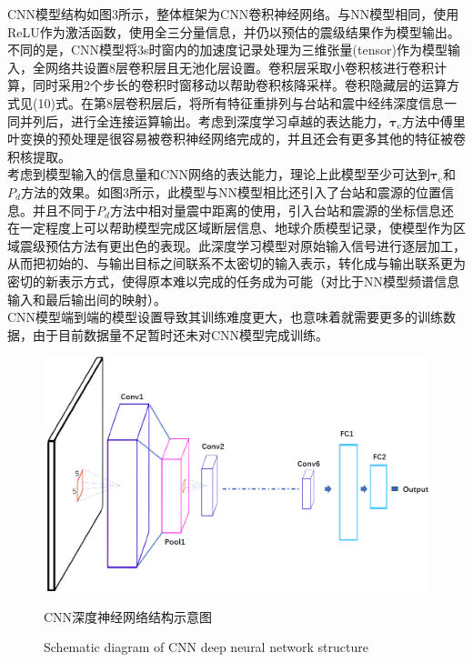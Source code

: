 \indent CNN模型结构如图3所示，整体框架为CNN卷积神经网络。与NN模型相同，使用ReLU作为激活函数，使用全三分量信息，并仍以预估的震级结果作为模型输出。不同的是，CNN模型将3s时窗内的加速度记录处理为三维张量(tensor)作为模型输入，全网络共设置8层卷积层且无池化层设置。卷积层采取小卷积核进行卷积计算，同时采用2个步长的卷积时窗移动以帮助卷积核降采样。卷积隐藏层的运算方式见(10)式。在第8层卷积层后，将所有特征重排列与台站和震中经纬深度信息一同并列后，进行全连接运算输出。考虑到深度学习卓越的表达能力，$\mathbf{\tau}_{\mathrm{c}}$方法中傅里叶变换的预处理是很容易被卷积神经网络完成的，并且还会有更多其他的特征被卷积核提取。\\
\indent 考虑到模型输入的信息量和CNN网络的表达能力，理论上此模型至少可达到$\mathbf{\tau}_{\mathrm{c}}$和$P_{d}$方法的效果。如图3所示，此模型与NN模型相比还引入了台站和震源的位置信息。并且不同于$P_{d}$方法中相对量震中距离的使用，引入台站和震源的坐标信息还在一定程度上可以帮助模型完成区域断层信息、地球介质模型记录，使模型作为区域震级预估方法有更出色的表现。此深度学习模型对原始输入信号进行逐层加工，从而把初始的、与输出目标之间联系不太密切的输入表示，转化成与输出联系更为密切的新表示方式，使得原本难以完成的任务成为可能（对比于NN模型频谱信息输入和最后输出间的映射）。\\
\indent CNN模型端到端的模型设置导致其训练难度更大，也意味着就需要更多的训练数据，由于目前数据量不足暂时还未对CNN模型完成训练。\\
\begin{figure}[h] 
\centering 
 \includegraphics[width=0.99\linewidth]{img/CNN-paper.png} 
 \renewcommand{\figurename}{图} 
\caption{CNN深度神经网络结构示意图} 
\addtocounter{figure}{-1} \vspace{-5pt} 
\renewcommand{\figurename}{Fig} 
\caption{Schematic diagram of CNN deep neural network structure} 
\renewcommand{\figurename}{图} 
\label{fig:network-device-influence.png} 
\end{figure}

